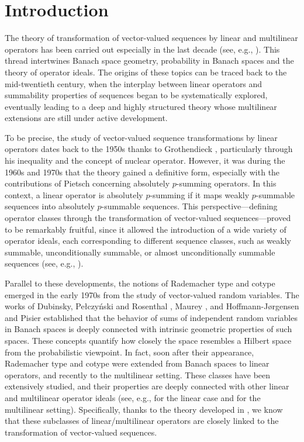 \documentclass[12pt]{amsart}
\begin{document}
\maketitle

\section*{Introduction}

The theory of transformation of vector-valued sequences by linear and multilinear operators has been carried out especially in the last decade (see, e.g., \cite{BotCam-17, BotSan-25, BotSan-252, BotWoo-23, GalVil-15}). This thread intertwines Banach space geometry, probability in Banach spaces and the theory of operator ideals. The origins of these topics can be traced back to the mid-twentieth century, when the interplay between linear operators and summability properties of sequences began to be systematically explored, eventually leading to a deep and highly structured theory whose multilinear extensions are still under active development.

To be precise, the study of vector-valued sequence transformations by linear operators dates back to the 1950s thanks to Grothendieck \cite{Gro-55}, particularly through his inequality and the concept of nuclear operator. However, it was during the 1960s and 1970s that the theory gained a definitive form, especially with the contributions of Pietsch concerning absolutely $p$-summing operators. In this context, a linear operator is absolutely $p$-summing if it maps weakly $p$-summable sequences into absolutely $p$-summable sequences. This perspective—defining operator classes through the transformation of vector-valued sequences—proved to be remarkably fruitful, since it allowed the introduction of a wide variety of operator ideals, each corresponding to different sequence classes, such as weakly summable, unconditionally summable, or almost unconditionally summable sequences (see, e.g., \cite{BotBraJun-01, BotPelRue-14, DieJarTon-95, JunMat-98, Pie-80}).

Parallel to these developments, the notions of Rademacher type and cotype emerged in the early 1970s from the study of vector-valued random variables. The works of Dubinsky, Pe{\l}czy{\'n}ski and Rosenthal \cite{DubPelRos-72}, Maurey \cite{Mau-74}, and Hoffmann-J{\o}rgensen and Pisier \cite{HofPis-76} established that the behavior of sums of independent random variables in Banach spaces is deeply connected with intrinsic geometric properties of such spaces. These concepts quantify how closely the space resembles a Hilbert space from the probabilistic viewpoint. In fact, soon after their appearance, Rademacher type and cotype were extended from Banach spaces to linear operators, and recently to the multilinear setting. These classes have been extensively studied, and their properties are deeply connected with other linear and multilinear operator ideals (see, e.g., \cite{DieJarPie-01, Pis-86} for the linear case and \cite{BotCam-16, BotCamNas-24, BotFre-24, CamNasSou-25} for the multilinear setting). Specifically, thanks to the theory developed in \cite{BotCam-17}, we know that these subclasses of linear/multilinear operators are closely linked to the transformation of vector-valued sequences.
\end{document}
